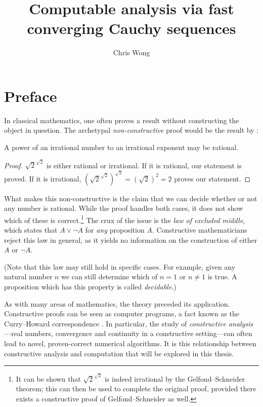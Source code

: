 \documentclass[leqno]{report}
\begin{document}
\author{Chris Wong}
\title{Computable analysis via fast converging Cauchy sequences}
\maketitle

\chapter*{Preface}

In classical mathematics, one often proves a result without constructing the object in question. The archetypal \textit{non-constructive} proof would be the result by \citet{jarden1953simple}:

\begin{Theorem}
    A power of an irrational number to an irrational exponent may be rational.
\end{Theorem}

\begin{proof}
    $\sqrt{2}^{\sqrt{2}}$ is either rational or irrational. If it is rational, our statement is proved. If it is irrational, $(\sqrt{2}^{\sqrt{2}})^{\sqrt{2}} = (\sqrt{2})^2 = 2$ proves our statement.
\end{proof}

What makes this non-constructive is the claim that we can decide whether or not any number is rational. While the proof handles both cases, it does not show which of these is correct.\footnote{It can be shown that $\sqrt{2}^{\sqrt{2}}$ is indeed irrational by the Gelfond--Schneider theorem; this can then be used to complete the original proof, provided there exists a constructive proof of Gelfond--Schneider as well.} The crux of the issue is the \textit{law of excluded middle}, which states that $A \vee \neg A$ for \emph{any} proposition $A$. Constructive mathematicians reject this law in general, as it yields no information on the construction of either $A$ or $\neg A$.

(Note that this law may still hold in specific cases. For example, given any natural number $n$ we can still determine which of $n = 1$ or $n \neq 1$ is true. A proposition which has this property is called \textit{decidable}.)

As with many areas of mathematics, the theory preceded its application. Constructive proofs can be seen as computer programs, a fact known as the Curry--Howard correspondence \citep{wadler2015}. In particular, the study of \textit{constructive analysis}---real numbers, convergence and continuity in a constructive setting---can often lead to novel, proven-correct numerical algorithms. It is this relationship between constructive analysis and computation that will be explored in this thesis.
\end{document}

